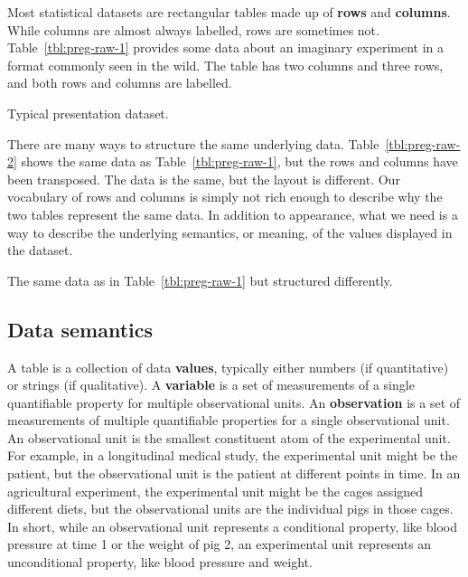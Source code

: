 \documentclass[article]{jss}
\begin{document}
Most statistical datasets are rectangular tables made up of \textbf{rows} and \textbf{columns}. While columns are almost always labelled, rows are sometimes not. Table~\ref{tbl:preg-raw-1} provides some data about an imaginary experiment in a format commonly seen in the wild. The table has two columns and three rows, and both rows and columns are labelled.

\begin{table}[htbp]
  \centering
  
  \caption{Typical presentation dataset.}
  \label{tbl:preg-raw-1}
\end{table}

There are many ways to structure the same underlying data. Table~\ref{tbl:preg-raw-2} shows the same data as Table~\ref{tbl:preg-raw-1}, but the rows and columns have been transposed. The data is the same, but the layout is different. Our vocabulary of rows and columns is simply not rich enough to describe why the two tables represent the same data. In addition to appearance, what we need is a way to describe the underlying semantics, or meaning, of the values displayed in the dataset.

\begin{table}[htbp]
  \centering
  
  \caption{The same data as in Table~\ref{tbl:preg-raw-1} but structured differently.}
  \label{tbl:preg-raw-2}
\end{table}

\subsection{Data semantics}

A table is a collection of data \textbf{values}, typically either numbers (if quantitative) or strings (if qualitative). A \textbf{variable} is a set of measurements of a single quantifiable property for multiple observational units. An \textbf{observation} is a set of measurements of multiple quantifiable properties for a single observational unit. An observational unit is the smallest constituent atom of the experimental unit. For example, in a longitudinal medical study, the experimental unit might be the patient, but the observational unit is the patient at different points in time. In an agricultural experiment, the experimental unit might be the cages assigned different diets, but the observational units are the individual pigs in those cages. In short, while an observational unit represents a conditional property, like blood pressure at time 1 or the weight of pig 2, an experimental unit represents an unconditional property, like blood pressure and weight.
\end{document}
